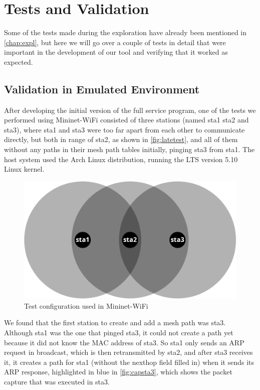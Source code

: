 \chapter{Tests and Validation}\label{chap:tests}

Some of the tests made during the exploration have already been mentioned in
\autoref{chap:expl}, but here we will go over a couple of tests in detail that
were important in the development of our tool and verifying that it worked as
expected.

\section{Validation in Emulated Environment}

After developing the initial version of the full service program, one of the
tests we performed using Mininet-WiFi consisted of three stations (named sta1
sta2 and sta3), where sta1 and sta3 were too far apart from each other to
communicate directly, but both in range of sta2, as shown in
\autoref{fig:latetest}, and all of them without any paths in their mesh path
tables initially, pinging sta3 from sta1. The host system used the Arch Linux
distribution, running the \ac{LTS} version 5.10 Linux kernel.

\begin{figure}[htb]
   \centering
   \includegraphics[scale=.3]{latetest}
   \caption{Test configuration used in Mininet-WiFi}\label{fig:latetest}
\end{figure}

We found that the first station to create and add a mesh path was sta3. Although
sta1 was the one that pinged sta3, it could not create a path yet because it did
not know the \ac{MAC} address of sta3. So sta1 only sends an \ac{ARP} request in
broadcast, which is then retransmitted by sta2, and after sta3 receives it, it
creates a path for sta1 (without the nexthop field filled in) when it sends its
\ac{ARP} response, highlighted in blue in \autoref{fig:capsta3}, which shows the
packet capture that was executed in sta3.

